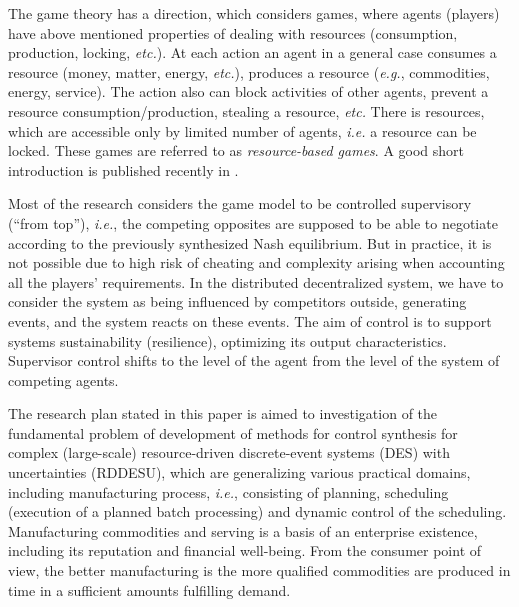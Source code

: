 \documentclass[runningheads]{llncs}
\begin{document}

The game theory has a direction, which considers games, where agents (players) have above mentioned properties of dealing with resources (consumption, production, locking, \emph{etc.}).  At each action an agent in a general case consumes a resource (money, matter, energy, \emph{etc.}), produces a resource (\emph{e.g.}, commodities, energy, service).  The action also can block activities of other agents, prevent a resource consumption/production, stealing a resource, \emph{etc.}  There is resources, which are accessible only by limited number of agents, \emph{i.e.} a resource can be locked. These games are referred to as \emph{resource-based games}. A good short introduction is published recently in \cite{rbg}.

Most of the research considers the game model to be controlled supervisory (“from top”), \emph{i.e.}, the competing opposites are supposed to be able to negotiate according to the previously synthesized Nash equilibrium. But in practice, it is not possible due to high risk of cheating and complexity arising when accounting all the players’ requirements. In the distributed decentralized system, we have to consider the system as being influenced by competitors outside, generating events, and the system reacts on these events. The aim of control is to support systems sustainability (resilience), optimizing its output characteristics. Supervisor control shifts to the level of the agent from the level of the system of competing agents. %

The research plan stated in this paper is aimed to investigation of the fundamental problem of development of methods for control synthesis for complex (large-scale) resource-driven discrete-event systems (DES) with uncertainties (RDDESU), which are generalizing various practical domains, including manufacturing process, \emph{i.e.}, consisting of planning, scheduling (execution of a planned batch processing) and dynamic control of the scheduling.  Manufacturing commodities and serving is a basis of an enterprise existence, including its reputation and financial well-being. From the consumer point of view, the better manufacturing is the more qualified commodities are produced in time in a sufficient amounts fulfilling demand.
\end{document}
